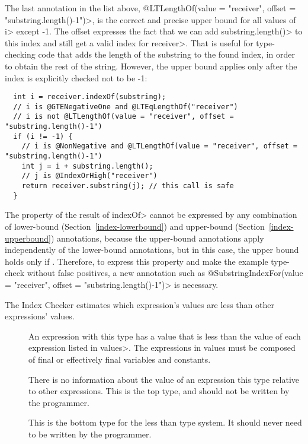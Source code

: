 \noindent
The last annotation in the list above,
\<@LTLengthOf(value = "receiver", offset = "substring.length()-1")>,
is the correct and precise upper bound for all values of \<i> except -1.
The offset expresses the fact that we can add \<substring.length()> to this
index and still get a valid index for \<receiver>.  That is useful for
type-checking code that adds the length of the substring to the found
index, in order to obtain the rest of the string.  However, the upper bound
applies only after the index is explicitly checked not to be -1:

\begin{Verbatim}
  int i = receiver.indexOf(substring);
  // i is @GTENegativeOne and @LTEqLengthOf("receiver")
  // i is not @LTLengthOf(value = "receiver", offset = "substring.length()-1")
  if (i != -1) {
    // i is @NonNegative and @LTLengthOf(value = "receiver", offset = "substring.length()-1")
    int j = i + substring.length();
    // j is @IndexOrHigh("receiver")
    return receiver.substring(j); // this call is safe
  }
\end{Verbatim}

The property of the result of \<indexOf> cannot be expressed by any
combination of lower-bound (Section~\ref{index-lowerbound}) and upper-bound
(Section~\ref{index-upperbound}) annotations, because the upper-bound
annotations apply independently of the lower-bound annotations, but in this
case, the upper bound 
holds only if .  Therefore, to express this property and make
the example type-check without false positives, a new annotation such as
\<@SubstringIndexFor\allowbreak(value = "receiver", offset = "substring.length()-1")>
is necessary.


The Index Checker estimates which expression's values are less than other expressions' values.

\begin{description}

\item[]
  An expression with this type has a value that is less than the value of each
  expression listed in \<values>. The expressions in values must be composed of
  final or effectively final variables and constants.

\item[]
  There is no information about the value of an expression this type relative to other expressions.
  This is the top type, and should not be written by the programmer.

 \item[]
   This is the bottom type for the less than type system. It should
   never need to be written by the programmer.

\end{description}


